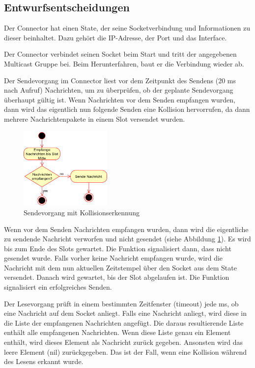 \documentclass[draft=false
              ,paper=a4
              ,twoside=false
              ,fontsize=11pt
              ,headsepline
              ,BCOR10mm
              ,DIV11
              ]{scrbook}
\begin{document}
\subsection{Entwurfsentscheidungen}
Der Connector hat einen State, der seine Socketverbindung und Informationen zu dieser beinhaltet. Dazu gehört die IP-Adresse, der Port und das Interface.

Der Connector verbindet seinen Socket beim Start und tritt der angegebenen Multicast Gruppe bei. Beim Herunterfahren, baut er die Verbindung wieder ab.

Der Sendevorgang im Connector liest vor dem Zeitpunkt des Sendens (20 ms nach Aufruf) Nachrichten, um zu überprüfen, ob der geplante Sendevorgang überhaupt gültig ist. Wenn Nachrichten vor dem Senden empfangen wurden, dann wird das eigentlich nun folgende Senden eine Kollision hervorrufen, da dann mehrere Nachrichtenpakete in einem Slot versendet wurden.

\begin{figure}[h]
\centering
\includegraphics[width=0.4\textwidth]{send-collision.png}
\caption[send-collision]{Sendevorgang mit Kollisionserkennung}
\label{fig:send-collision}
\end{figure}

Wenn vor dem Senden Nachrichten empfangen wurden, dann wird die eigentliche zu sendende Nachricht verworfen und nicht gesendet (siehe Abbildung \ref{fig:send-collision}). Es wird bis zum Ende des Slots gewartet. Die Funktion signalisiert dann, dass nicht gesendet wurde.
Falls vorher keine Nachricht empfangen wurde, wird die Nachricht mit dem nun aktuellen Zeitstempel über den Socket aus dem State versendet. Danach wird gewartet, bis der Slot abgelaufen ist. Die Funktion signalisiert ein erfolgreiches Senden.

Der Lesevorgang prüft in einem bestimmten Zeitfenster (timeout) jede ms, ob eine Nachricht auf dem Socket anliegt. Falls eine Nachricht anliegt, wird diese in die Liste der empfangenen Nachrichten angefügt. Die daraus resultierende Liste enthält alle empfangenen Nachrichten. Wenn diese Liste genau ein Element enthält, wird dieses Element als Nachricht zurück gegeben. Ansonsten wird das leere Element (nil) zurückgegeben. Das ist der Fall, wenn eine Kollision während des Lesens erkannt wurde.
\end{document}
